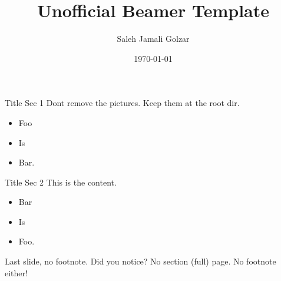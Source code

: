 \documentclass{beamer}
\title{Unofficial Beamer Template}
\author{Saleh Jamali Golzar}
\date{\today}
\begin{document}

    \begin{frame}{Title Sec 1}
        Dont remove the pictures. Keep them at the root dir.
        \begin{itemize}
            \item Foo
            \item Is
            \item Bar.
        \end{itemize}
    \end{frame}


    \begin{frame}{Title Sec 2}
        This is the content.
        \begin{itemize}
            \item Bar
            \item Is
            \item Foo.
        \end{itemize}
    \end{frame}

    \footertext{}
    \begin{frame}{Last slide, no footnote.}
        Did you notice? No section (full) page. No footnote either!
    \end{frame}
\end{document}
